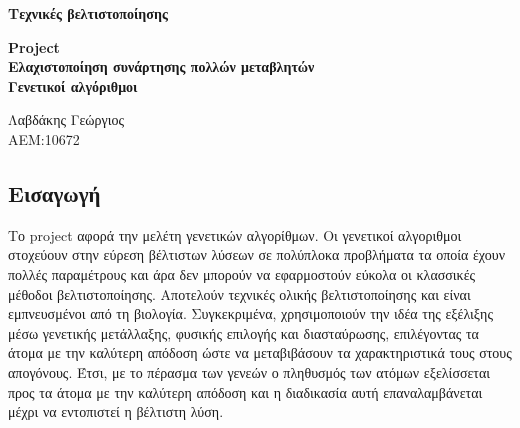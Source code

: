 \documentclass[11pt,a4paper,onecolumn,final]{article}
\begin{document}
\thispagestyle{empty}
{\sffamily\centering\Large

{\Large \textbf{Τεχνικές βελτιστοποίησης} \\[0.5cm]

\vspace{1.0cm}

{\Large \textbf{Project}\\
\textbf{Ελαχιστοποίηση συνάρτησης πολλών μεταβλητών} \\
\textbf{Γενετικοί αλγόριθμοι} \\[0.5cm]

\vspace{1.0cm}

{\LARGE Λαβδάκης Γεώργιος \\
ΑΕΜ:10672}

\vspace{1.0cm}

\newpage

\tableofcontents

\newpage

\begin{flushleft}

\section{Εισαγωγή}

Το project αφορά την μελέτη γενετικών αλγορίθμων. Οι γενετικοί αλγοριθμοι στοχεύουν στην εύρεση βέλτιστων λύσεων σε πολύπλοκα προβλήματα τα οποία έχουν πολλές παραμέτρους και άρα δεν μπορούν να εφαρμοστούν εύκολα οι κλασσικές μέθοδοι βελτιστοποίησης. Αποτελούν τεχνικές ολικής βελτιστοποίησης και είναι εμπνευσμένοι από τη βιολογία. Συγκεκριμένα, χρησιμοποιούν την ιδέα της εξέλιξης μέσω γενετικής μετάλλαξης, φυσικής επιλογής και διασταύρωσης, επιλέγοντας τα άτομα με την καλύτερη απόδοση ώστε να μεταβιβάσουν τα χαρακτηριστικά τους στους απογόνους.  Έτσι, με το πέρασμα των γενεών ο πληθυσμός των ατόμων εξελίσσεται προς τα άτομα με την καλύτερη απόδοση και η διαδικασία αυτή επαναλαμβάνεται μέχρι να εντοπιστεί η βέλτιστη λύση.

\vspace{0.4cm}


\end{flushleft}}}}
\end{document}
